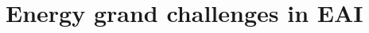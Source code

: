 \documentclass[12pt]{article}
\begin{document}
\section*{Energy grand challenges in EAI}\label{sec:energy_grand_challenges}
\end{document}
